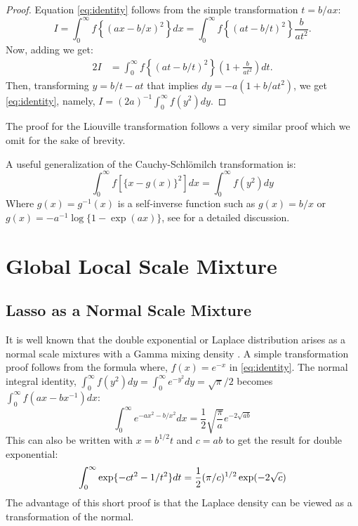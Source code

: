 \documentclass[lineno]{biometrika}
\begin{document}
\begin{proof}
Equation \eqref{eq:identity} follows from the simple transformation $t = b/ax$: 
\begin{equation*}
  I = \int_{0}^{\infty} f \left\{(ax - b/x)^2 \right\} dx = \int_{0}^{\infty} f \left\{(at - b/t)^2 \right\} \frac{b}{at^2}.
\end{equation*}
Now, adding we get: 
\begin{align*}
2 I & = \int_{0}^{\infty} f \left\{(at - b/t)^2 \right\} \left( 1+\frac{b}{at^2} \right) dt.
\end{align*}
Then, transforming $y = b/t - at$ that implies $dy = -a (1+b/at^2)$, we get \eqref{eq:identity}, namely, $I = (2a)^{-1} \int_{0}^{\infty} f(y^2) dy$. 
\end{proof}
The proof for the Liouville transformation follows a very similar proof which we omit for the sake of brevity. 

A useful generalization of the Cauchy-Schl\"omilch transformation is: 
\begin{equation}
  \int_0^\infty f \left[ \{x-g(x)\}^2 \right] dx = \int_0^\infty f( y^2 ) dy \label{eq:gen}
\end{equation}
Where $g(x)=g^{-1}(x)$ is a self-inverse function such as $g(x) = b/x$ or $g(x) = -a^{-1}\log\{1-\exp(a x)\}$, see \citep{jones2010distributions,jones2014generating} for a detailed discussion. %

\section{Global Local Scale Mixture}
\subsection{Lasso as a Normal Scale Mixture}
It is well known that the double exponential or Laplace distribution arises as a normal scale mixtures with a Gamma mixing density \citep{andrews1974scale}. A simple transformation proof follows from the \CS formula where, $ f(x) = e^{-x} $ in \eqref{eq:identity}. The normal integral identity, $ \int_{0}^{\infty} f(y^2) dy = \int_0^\infty e^{-y^2} d y = \sqrt{\pi}/2 $ becomes $\int_{0}^{\infty} f(ax-bx^{-1}) dx$:  
$$
\int_0^\infty e^{- a x^2 - b / x^2 } d x = \frac{1}{2} \sqrt{ \frac{\pi}{a}} e^{- 2 \sqrt{ab}}
$$
This can also be written with $ x = b^{1/2} t $ and $c = ab$ to get the \citet{andrews1974scale} result for double exponential: 
\begin{equation}
  \int_0^\infty \exp \{- c t^2 - 1/t^2 \} d t = \half (\pi/c)^{1/2} \exp (-2 \sqrt{c}) \label{eq:andrews}
\end{equation}
The advantage of this short proof is that the Laplace density can be viewed as a transformation of the normal. 
\end{document}
